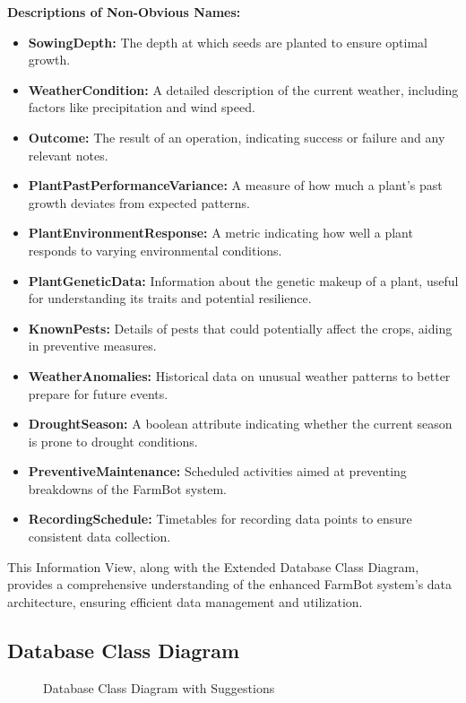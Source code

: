 \textbf{Descriptions of Non-Obvious Names:}
\begin{itemize}
    \item \textbf{SowingDepth:} The depth at which seeds are planted to ensure optimal growth.
    \item \textbf{WeatherCondition:} A detailed description of the current weather, including factors like precipitation and wind speed.
    \item \textbf{Outcome:} The result of an operation, indicating success or failure and any relevant notes.
    \item \textbf{PlantPastPerformanceVariance:} A measure of how much a plant's past growth deviates from expected patterns.
    \item \textbf{PlantEnvironmentResponse:} A metric indicating how well a plant responds to varying environmental conditions.
    \item \textbf{PlantGeneticData:} Information about the genetic makeup of a plant, useful for understanding its traits and potential resilience.
    \item \textbf{KnownPests:} Details of pests that could potentially affect the crops, aiding in preventive measures.
    \item \textbf{WeatherAnomalies:} Historical data on unusual weather patterns to better prepare for future events.
    \item \textbf{DroughtSeason:} A boolean attribute indicating whether the current season is prone to drought conditions.
    \item \textbf{PreventiveMaintenance:} Scheduled activities aimed at preventing breakdowns of the FarmBot system.
    \item \textbf{RecordingSchedule:} Timetables for recording data points to ensure consistent data collection.
\end{itemize}

This Information View, along with the Extended Database Class Diagram, provides a comprehensive understanding of the enhanced FarmBot system's data architecture, ensuring efficient data management and utilization.


\subsection{Database Class Diagram}

\begin{figure}[H]
    \centering
    
    \caption{Database Class Diagram with Suggestions}
\end{figure}

